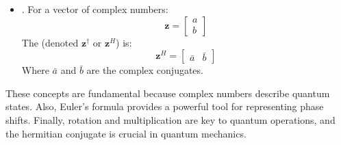 \begin{itemize}
    \item {}. For a vector of complex numbers:
    \begin{equation*}
        \mathbf{z} = \begin{bmatrix} a \\ b \end{bmatrix}
    \end{equation*}
    The  (denoted $\mathbf{z}^{\dagger}$ or $\mathbf{z}^{H}$) is:
    \begin{equation*}
        \mathbf{z}^H = \begin{bmatrix} \bar{a} & \bar{b} \end{bmatrix}  
    \end{equation*}
    Where $\bar{a}$ and $\bar{b}$ are the complex conjugates.
\end{itemize}
These concepts are fundamental because complex numbers describe quantum states. Also, Euler's formula provides a powerful tool for representing phase shifts. Finally, rotation and multiplication are key to quantum operations, and the hermitian conjugate is crucial in quantum mechanics.